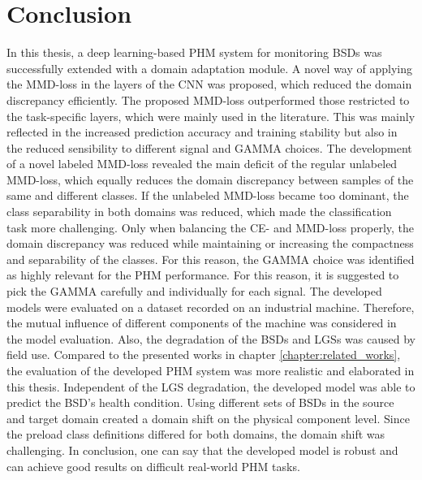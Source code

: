 \chapter{Conclusion}\label{chapter:conclusion}

In this thesis, a deep learning-based PHM system for monitoring BSDs was successfully extended with a domain adaptation module. A novel way of applying the MMD-loss in the layers of the CNN was proposed, which reduced the domain discrepancy efficiently. The proposed MMD-loss outperformed those restricted to the task-specific layers, which were mainly used in the literature. This was mainly reflected in the increased prediction accuracy and training stability but also in the reduced sensibility to different signal and GAMMA choices. The development of a novel labeled MMD-loss revealed the main deficit of the regular unlabeled MMD-loss, which equally reduces the domain discrepancy between samples of the same and different classes. If the unlabeled MMD-loss became too dominant, the class separability in both domains was reduced, which made the classification task more challenging. Only when balancing the CE- and MMD-loss properly, the domain discrepancy was reduced while maintaining or increasing the compactness and separability of the classes. For this reason, the GAMMA choice was identified as highly relevant for the PHM performance. For this reason, it is suggested to pick the GAMMA carefully and individually for each signal. The developed models were evaluated on a dataset recorded on an industrial machine. Therefore, the mutual influence of different components of the machine was considered in the model evaluation. Also, the degradation of the BSDs and LGSs was caused by field use. Compared to the presented works in chapter \ref{chapter:related_works}, the evaluation of the developed PHM system was more realistic and elaborated in this thesis. Independent of the LGS degradation, the developed model was able to predict the BSD's health condition. Using different sets of BSDs in the source and target domain created a domain shift on the physical component level. Since the preload class definitions differed for both domains, the domain shift was challenging. In conclusion, one can say that the developed model is robust and can achieve good results on difficult real-world PHM tasks.